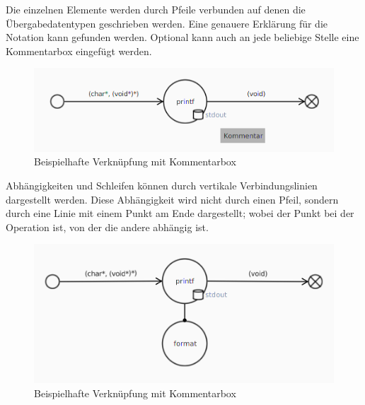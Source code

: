 Die einzelnen Elemente werden durch Pfeile verbunden auf denen die Übergabedatentypen geschrieben werden. Eine genauere
Erklärung für die Notation kann  gefunden werden. Optional kann auch an jede beliebige Stelle
eine Kommentarbox eingefügt werden.
\begin{figure}[H]
	\centering
	\includegraphics[width=\maxwidth{.9\textwidth}]{Element_connected_comment.png}
	\caption{Beispielhafte Verknüpfung mit Kommentarbox}
\end{figure}

Abhängigkeiten und Schleifen können durch vertikale Verbindungslinien dargestellt werden. Diese Abhängigkeit wird nicht durch einen
Pfeil, sondern durch eine Linie mit einem Punkt am Ende dargestellt; wobei der Punkt bei der Operation ist, von der die andere
abhängig ist.
\begin{figure}[H]
	\centering
	\includegraphics[width=\maxwidth{.9\textwidth}]{Element_connected_dep.png}
	\caption{Beispielhafte Verknüpfung mit Kommentarbox}
\end{figure}

\subsubsection{\textFlowNotation}
\label{\textFlowNotation}